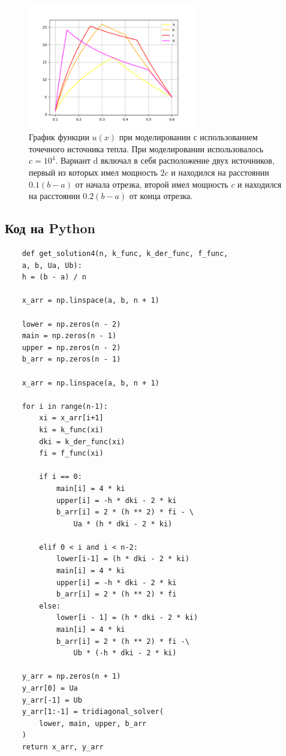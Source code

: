 \documentclass[12pt]{article}%
\begin{document}
\begin{figure}[H]
    \centering
    \includegraphics[width=0.65\textwidth]{task3.png}
    \caption{График функции $u(x)$ при моделировании с использованием точечного источника тепла. При моделировании использовалось $c=10^4$. Вариант d включал в себя расположение двух источников, первый из которых имел мощность $2c$ и находился на расстоянии $0.1 (b - a)$ от начала отрезка, второй имел мощность $c$ и находился на расстоянии $0.2 (b - a)$ от конца отрезка.  
    }
\end{figure}

\subsection{Код на Python}
\begin{verbatim}
    def get_solution4(n, k_func, k_der_func, f_func, 
    a, b, Ua, Ub):
    h = (b - a) / n
    
    x_arr = np.linspace(a, b, n + 1)
    
    lower = np.zeros(n - 2)
    main = np.zeros(n - 1)
    upper = np.zeros(n - 2)
    b_arr = np.zeros(n - 1)

    x_arr = np.linspace(a, b, n + 1)
    
    for i in range(n-1):
        xi = x_arr[i+1]
        ki = k_func(xi)
        dki = k_der_func(xi)
        fi = f_func(xi)
    
        if i == 0:
            main[i] = 4 * ki
            upper[i] = -h * dki - 2 * ki
            b_arr[i] = 2 * (h ** 2) * fi - \
                Ua * (h * dki - 2 * ki)
    
        elif 0 < i and i < n-2:
            lower[i-1] = (h * dki - 2 * ki)
            main[i] = 4 * ki
            upper[i] = -h * dki - 2 * ki
            b_arr[i] = 2 * (h ** 2) * fi
        else:
            lower[i - 1] = (h * dki - 2 * ki)
            main[i] = 4 * ki
            b_arr[i] = 2 * (h ** 2) * fi -\
                Ub * (-h * dki - 2 * ki)

    y_arr = np.zeros(n + 1)
    y_arr[0] = Ua
    y_arr[-1] = Ub
    y_arr[1:-1] = tridiagonal_solver(
        lower, main, upper, b_arr
    )
    return x_arr, y_arr
\end{verbatim}
\end{document}
